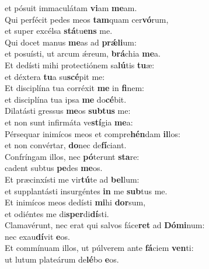\oddverse et pósuit immaculátam \textbf{vi}am \textbf{me}am.\\
\evenverse Qui perfécit pedes meos \textbf{tam}quam cer\textbf{vó}rum,~\*\\
\evenverse et super excélsa \textbf{stá}tu\textbf{ens} me.\\
\oddverse Qui docet manus \textbf{me}as ad \textbf{prǽ}\textbf{li}um:~\*\\
\oddverse et posuísti, ut arcum ǽreum, \textbf{brá}chia \textbf{me}a.\\
\evenverse Et dedísti mihi protectiónem sa\textbf{lú}tis \textbf{tu}æ:~\*\\
\evenverse et déxtera \textbf{tu}a su\textbf{scé}pit me:\\
\oddverse Et disciplína tua corréxit \textbf{me} in \textbf{fi}nem:~\*\\
\oddverse et disciplína tua ipsa \textbf{me} do\textbf{cé}bit.\\
\evenverse Dilatásti gressus \textbf{me}os \textbf{sub}\textbf{tus} me:~\*\\
\evenverse et non sunt infirmáta ve\textbf{stí}gia \textbf{me}a:\\
\oddverse Pérsequar inimícos meos et compre\textbf{hén}dam \textbf{il}los:~\*\\
\oddverse et non convértar, \textbf{do}nec de\textbf{fí}ciant.\\
\evenverse Confríngam illos, nec \textbf{pó}terunt \textbf{sta}re:~\*\\
\evenverse cadent subtus \textbf{pe}des \textbf{me}os.\\
\oddverse Et præcinxísti me vir\textbf{tú}te ad \textbf{bel}lum:~\*\\
\oddverse et supplantásti insurgéntes \textbf{in} me \textbf{sub}tus me.\\
\evenverse Et inimícos meos dedísti \textbf{mi}hi \textbf{dor}sum,~\*\\
\evenverse et odiéntes me di\textbf{sper}di\textbf{dí}sti.\\
\oddverse Clamavérunt, nec erat qui salvos fáce\textbf{ret} ad \textbf{Dó}\textbf{mi}num:~\*\\
\oddverse nec exau\textbf{dí}vit \textbf{e}os.\\
\evenverse Et commínuam illos, ut púlverem ante \textbf{fá}ciem \textbf{ven}ti:~\*\\
\evenverse ut lutum plateárum de\textbf{lé}bo \textbf{e}os.\\
